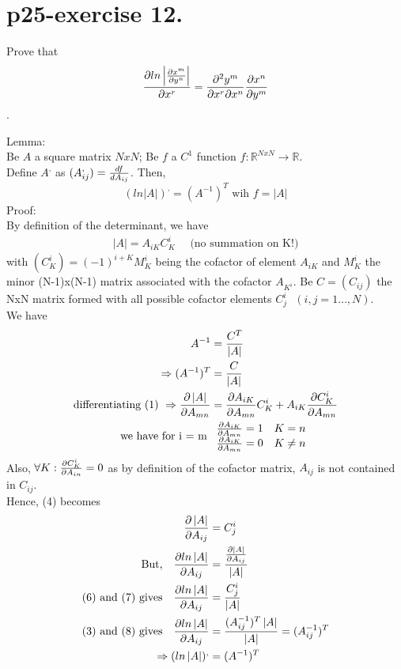 \section{p25-exercise 12.}
\begin{tcolorbox}
Prove that $$\pdv{ln\left|\pdv{x^m}{y^n}\right|}{x^r} =\pdv{y^m}{x^r}{x^n}\pdv{x^n}{y^m}$$.
\end{tcolorbox}
Lemma:\\
Be $A$ a square matrix $NxN$; Be $f$ a $C^1$ function $f:\mathbb{R}^{NxN} \rightarrow \mathbb{R}$. \\Define $A^{,}$ as $(A^,_{ij}) = \dv{f}{A_{ij}}$. Then,$$(ln\left|A\right|)^, = (A^{-1})^T \text{ wih }  f =\left|A\right|$$
Proof:\\
By definition of the determinant, we have
\begin{align}
\left|A\right| = A_{iK}C_{K}^i \quad \text{ (no summation on K!)}
\end{align}
with $(C_{K}^i) =  (-1)^{i+K}M^{i}_K$ being the cofactor  of element $A_{iK}$ and $M^{i}_K$ the minor (N-1)x(N-1) matrix associated with the cofactor $A_{K^i}$. Be $C = (C_{ij})$ the NxN matrix formed with all possible cofactor elements  $C_{j}^i \text{  }(i,j = 1 \dots,N)$.\\
We have 
\begin{align}
\ A^{-1} &= \frac{C^T}{\left|A\right|}\\
\Rightarrow (A^{-1})^T &= \frac{C}{\left|A\right|} \\
\text{differentiating (1) }\Rightarrow \pdv{\left|A\right|}{A_{mn}} &= \pdv{A_{iK}}{A_{mn}}C^i_K +A_{iK} \pdv{C^i_K}{A_{mn}}\\
\text{we have for i = m } & \begin{array}{c}
    \pdv{A_{iK}}{A_{mn}} = 1\quad K=n\\
    \pdv{A_{iK}}{A_{mn}} = 0\quad K \neq n\\
  \end{array}
\end{align}
Also, $\forall K: \pdv{C^i_K}{A_{in}} = 0 $ as by definition of the cofactor matrix, $A_{ij} $ is not contained in $C_{ij} $.\\
Hence, (4) becomes
\begin{align}
\pdv{\left|A\right|}{A_{ij}} &= C^i_j\\
\text{But,}\quad \pdv{ln\left|A\right|}{A_{ij}} &= \frac{\pdv{\left|A\right|}{A_{ij}}}{\left|A\right|}\\
\text{(6) and  (7) gives}\quad \pdv{ln\left|A\right|}{A_{ij}} &= \frac{C^i_j}{\left|A\right|}\\
\text{(3) and  (8) gives}\quad \pdv{ln\left|A\right|}{A_{ij}} &= \frac{(A^{-1}_{ij})^T \left|A\right|}{\left|A\right|} = (A^{-1}_{ij})^T \\
\Rightarrow (ln\left|A\right|)^, &= (A^{-1})^T
\end{align}\\\\

